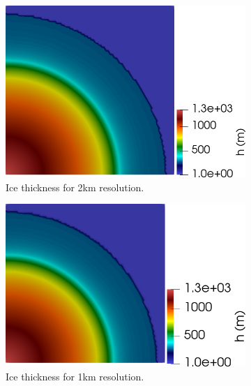 \documentclass{article}
\begin{document}
\begin{figure}[!h]
\begin{minipage}[t]{.45\textwidth}
\begin{subfigure}{\textwidth}
			\includegraphics[width=\linewidth]{../fig/2km_quarter_h_thickness_sin_fondo.png}
			\caption{Ice thickness for 2km resolution.}
			\label{h2km}
		\end{subfigure}
		\begin{subfigure}{\textwidth}
		\includegraphics[width=\linewidth]{../fig/1km_quarter_h_thickness_sin_fondo.png}
		\caption{Ice thickness for 1km resolution.}
		\label{h1km}
	    \end{subfigure}
	\end{minipage}\hfil
	\begin{minipage}[t]{.45\textwidth}
		\begin{subfigure}{\textwidth}

\end{subfigure}
\end{minipage}
\end{figure}
\end{document}
